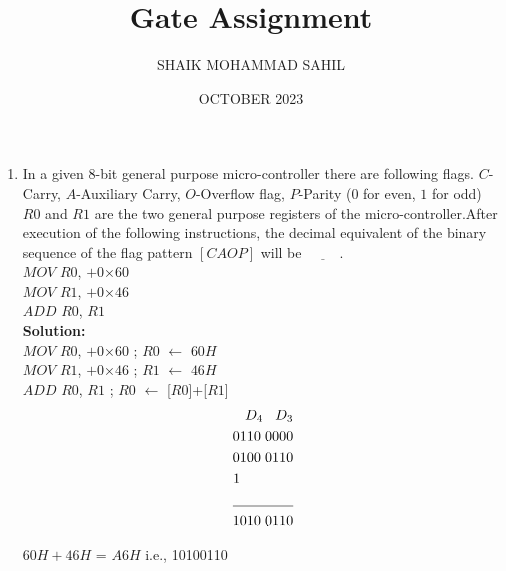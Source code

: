 \documentclass{article}
\title{Gate Assignment}
\author{SHAIK MOHAMMAD SAHIL}
\date{OCTOBER 2023}
\begin{document}
\maketitle

\begin{enumerate}
\item In a given $8$-bit general purpose micro-controller there are following flags. $C$-Carry, $A$-Auxiliary Carry, $O$-Overflow flag, $P$-Parity ($0$ for even, $1$ for odd) $R0$ and $R1$ are the two general purpose registers of the micro-controller.After execution of the following instructions, the decimal equivalent of the binary sequence of the flag pattern $[CAOP]$ will be $\underline{\hspace{1cm}}$.\\

$MOV$ $R0$, $+0$×$60$\\
$MOV$ $R1$, $+0$×$46$ \\
$ADD$ $R0$, $R1$\\

		\textbf{Solution:}\\

$MOV$ $R0$, $+0$×$60$ ; $R0$ $\leftarrow$ $60H$\\
$MOV$ $R1$, $+0$×$46$ ; $R1$ $\leftarrow$ $46H$\\
$ADD$ $R0$, $R1$ ; $R0$ $\leftarrow$ [$R0$]+[$R1$]\\

\begin{align*}
D_{4} \hspace{0.3cm}  D_{3}\\
0110 \hspace{0.1cm} 0000\\
0100 \hspace{0.1cm} 0110\\
1 \hspace{1.32cm}\\
\underline{\hspace{1.5cm}}\\	
1010 \hspace{0.1cm}  0110
\end{align*}

 $60H + 46H$ = $A6H$ i.e., 10100110\\
\\


\end{enumerate}
\end{document}
